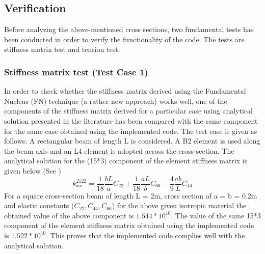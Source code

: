 \documentclass[a4paper,12pt]{article}
\begin{document}
\subsection*{Verification}
\indent\indent\indent\indent Before analyzing the above-mentioned cross sections, two fundamental tests has been conducted in order to verify the functionality of the code. The tests are stiffness matrix test and tension test.

\subsubsection*{Stiffness matrix test (Test Case 1)}
\indent\indent\indent\indent In order to check whether the stiffness matrix derived using the Fundamental Nucleus (FN) technique (a rather new approach) works well, one of the components of the stiffness matrix derived for a particular case using analytical solution presented in the literature has been compared with the same component for the same case obtained using the implemented code. The test case is given as follows: A rectangular beam of length L is considered. A B2 element is used along the beam axis and an L4 element is adopted across the cross-section. The analytical solution for the (15*3) component of the element stiffness matrix is given below (See \cite{carrera2014finite})
\begin{equation}
k^{2122}_{xx} = \frac{1}{18} \frac{b L}{a} C_{22} + \frac{1}{18} \frac{a L}{b} C_{66} - \frac{4}{9} \frac{a b}{L} C_{44}
\end{equation}
For a square cross-section beam of length L = 2m, cross section of a = b = 0.2m and elastic constants ($C_{22},C_{44},C_{66}$) for the above given isotropic material the obtained value of the above component is $1.544*10^{10}$. The value of the same 15*3 component of the element stiffness matrix obtained using the implemented code is $1.522*10^{10}$. This proves that the implemented code complies well with the analytical solution.
\end{document}
